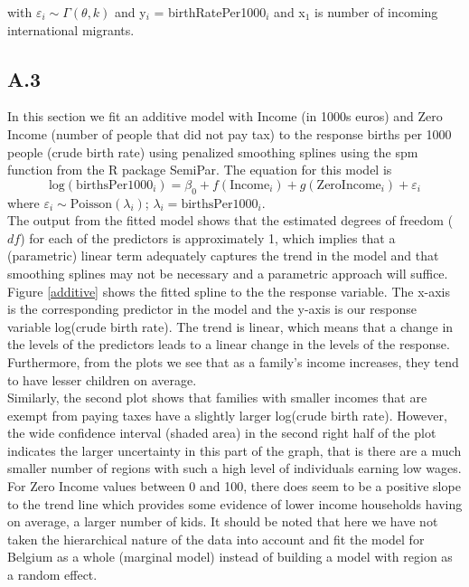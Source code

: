 \documentclass[paper=a4, fontsize=11pt]{scrartcl} %
\numberwithin{equation}{section} %
\begin{document}
with $\varepsilon_i \sim \Gamma(\theta, k)$ and y$_i$ = birthRatePer1000$_i$ and x$_1$ is number of incoming international migrants. 

\subsection{A.3}

In this section we fit an additive model with Income (in 1000s euros) and Zero Income (number of people that did not pay tax) to the response births per 1000 people (crude birth rate) using penalized smoothing splines using the spm function from the R package SemiPar. The equation for this model is 
$$\text{log}(\text{birthsPer1000}_i) = \beta_0 + f(\text{Income}_i) + g(\text{ZeroIncome}_i) + \varepsilon_i $$ where $\varepsilon_i  \sim \text{Poisson}(\lambda_i)$; $\lambda_i = \text{birthsPer1000}_i$.\\

The output from the fitted model shows that the estimated degrees of freedom ($df$) for each of the predictors is approximately 1, which implies that a (parametric) linear term adequately captures the trend in the model and that smoothing splines may not be necessary and a parametric approach will suffice. Figure \ref{additive} shows the fitted spline to the the response variable. The x-axis is the corresponding predictor in the model and the y-axis is our response variable log(crude birth rate). The trend is linear, which means that a change in the levels of the predictors leads to a linear change in the levels of the response. Furthermore, from the plots we see that as a family's income increases, they tend to have lesser children on average.\\

Similarly, the second plot shows that families with smaller incomes that are exempt from paying taxes have a slightly larger log(crude birth rate). However, the wide confidence interval (shaded area) in the second right half of the plot indicates the larger uncertainty in this part of the graph, that is there are a much smaller number of regions with such a high level of individuals earning low wages. For Zero Income values between 0 and 100, there does seem to be a positive slope to the trend line which provides some evidence of lower income households having on average, a larger number of kids. It should be noted that here we have not taken the hierarchical nature of the data into account and fit the model for Belgium as a whole (marginal model) instead of building a model with region as a random effect.
\end{document}
